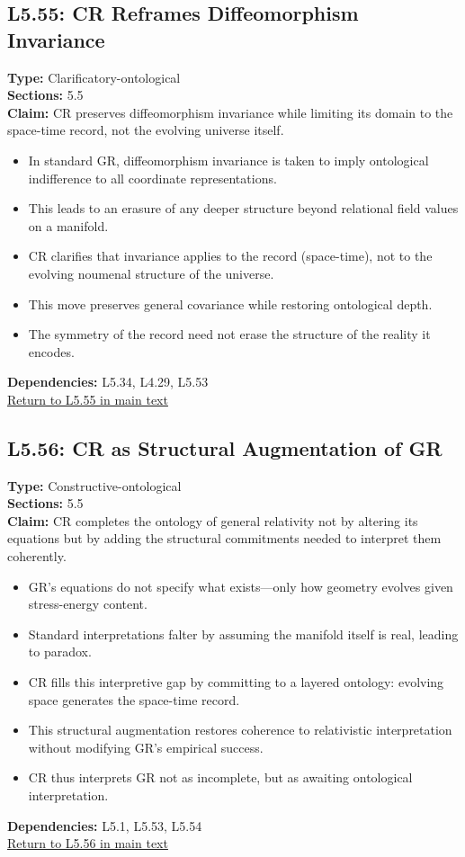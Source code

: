 \documentclass[12pt]{book}
\newcommand{\returnlink}[1]{\hyperref[logic:#1]{Return to #1 in main text}\xspace}
\begin{document}
\subsection*{L5.55: CR Reframes Diffeomorphism Invariance}
\label{appendix:L5.55}
\textbf{Type:} Clarificatory-ontological \\
\textbf{Sections:} 5.5 \\
\textbf{Claim:} CR preserves diffeomorphism invariance while limiting its domain to the space-time record, not the evolving universe itself.
\begin{itemize}
  \item In standard GR, diffeomorphism invariance is taken to imply ontological indifference to all coordinate representations.
  \item This leads to an erasure of any deeper structure beyond relational field values on a manifold.
  \item CR clarifies that invariance applies to the record (space-time), not to the evolving noumenal structure of the universe.
  \item This move preserves general covariance while restoring ontological depth.
  \item The symmetry of the record need not erase the structure of the reality it encodes.
\end{itemize}
\textbf{Dependencies:} L5.34, L4.29, L5.53 \\
\returnlink{L5.55}

\subsection*{L5.56: CR as Structural Augmentation of GR}
\label{appendix:L5.56}
\textbf{Type:} Constructive-ontological \\
\textbf{Sections:} 5.5 \\
\textbf{Claim:} CR completes the ontology of general relativity not by altering its equations but by adding the structural commitments needed to interpret them coherently.
\begin{itemize}
  \item GR's equations do not specify what exists---only how geometry evolves given stress-energy content.
  \item Standard interpretations falter by assuming the manifold itself is real, leading to paradox.
  \item CR fills this interpretive gap by committing to a layered ontology: evolving space generates the space-time record.
  \item This structural augmentation restores coherence to relativistic interpretation without modifying GR's empirical success.
  \item CR thus interprets GR not as incomplete, but as awaiting ontological interpretation.
\end{itemize}
\textbf{Dependencies:} L5.1, L5.53, L5.54 \\
\returnlink{L5.56}
\end{document}
